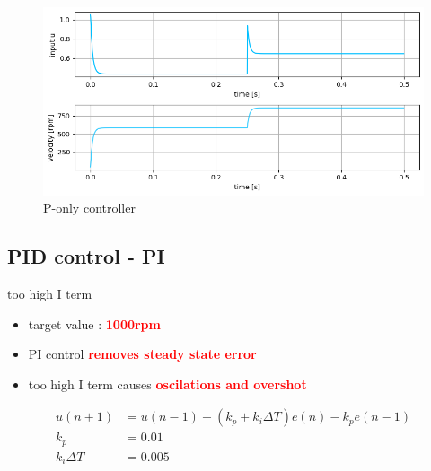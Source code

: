 \documentclass[12pt,twoside,onecolumn,openany,extrafontsizes,dvipsnames]{memoir}
\begin{document}
                    \begin{figure}[!htb]
                        \centering
                        \includegraphics[scale=0.8]{../images/motor_control/pid_p_control.png}
                        \caption{P-only controller}
                        \label{fig:p_controller}
                    \end{figure}

                \newpage
                \subsection{PID control - PI}
                    
                    too high I term 

                    \begin{itemize}
                        \item  target value : \textcolor{red}{\textbf {1000rpm}}
                        \item  PI control \textcolor{red}{\textbf {removes steady state error}}
                        \item  too high I term causes \textcolor{red}{\textbf {oscilations and overshot}}
                    \end{itemize}
                
                
                    \begin{align}
                        u(n+1) &= u(n-1) + (k_p + k_i\Delta T) e(n) - k_pe(n-1) \\
                        k_p    &= 0.01 \nonumber \\
                        k_i\Delta T    &= 0.005 \nonumber
                    \end{align}
                    
\end{document}
